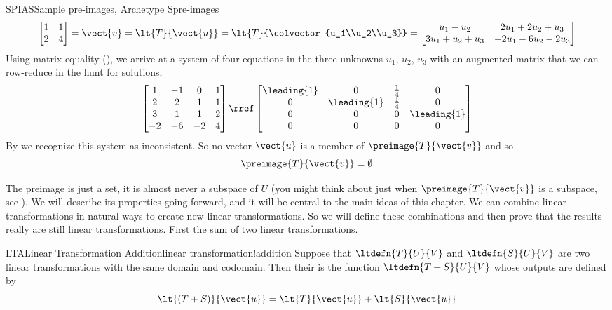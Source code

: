 \begin{example}{SPIAS}{Sample pre-images, Archetype S}{pre-images}
%
\begin{equation*}
\begin{bmatrix}
1&1\\2&4
\end{bmatrix}
=\vect{v}
=\lt{T}{\vect{u}}
=\lt{T}{\colvector{u_1\\u_2\\u_3}}\\
=\begin{bmatrix}
u_1-u_2&2u_1+2u_2+u_3\\
3u_1+u_2+u_3&-2u_1-6u_2-2u_3
\end{bmatrix}
\end{equation*}
%
Using matrix equality (), we arrive at a system of four equations in the three unknowns $u_1,\,u_2,\,u_3$ with an augmented matrix that we can row-reduce in the hunt for solutions,
%
\begin{equation*}
\begin{bmatrix}
1 & -1 & 0 & 1\\
2 & 2 & 1 & 1\\
3 & 1 & 1 & 2\\
-2 & -6 & -2 & 4
\end{bmatrix}
\rref
\begin{bmatrix}
\leading{1} & 0 & \frac{1}{4} &  0\\ 
0 & \leading{1} & \frac{1}{4} &  0\\ 
0 & 0 & 0 &  \leading{1}\\ 
0 & 0 & 0 &  0
\end{bmatrix}
\end{equation*}
%
By  we recognize this system as inconsistent.  So no vector $\vect{u}$ is a member of $\preimage{T}{\vect{v}}$ and so
%
\begin{equation*}
\preimage{T}{\vect{v}}=\emptyset
\end{equation*}
%
\end{example}
%
The preimage is just a set, it is almost never a subspace of $U$ (you might think about just when $\preimage{T}{\vect{v}}$ is a subspace, see ).  We will describe its properties going forward, and it will be central to the main ideas of this chapter.
%
%
We can combine linear transformations in natural ways to create new linear transformations.  So we will define these combinations and then prove that the results really are still linear transformations.  First the sum of two linear transformations.
%
\begin{definition}{LTA}{Linear Transformation Addition}{linear transformation!addition}
Suppose that $\ltdefn{T}{U}{V}$ and $\ltdefn{S}{U}{V}$ are two linear transformations with the same domain and codomain.  Then their  is the function $\ltdefn{T+S}{U}{V}$ whose outputs are defined by
%
\begin{equation*}
\lt{(T+S)}{\vect{u}}=\lt{T}{\vect{u}}+\lt{S}{\vect{u}}
\end{equation*}
%
\end{definition}
